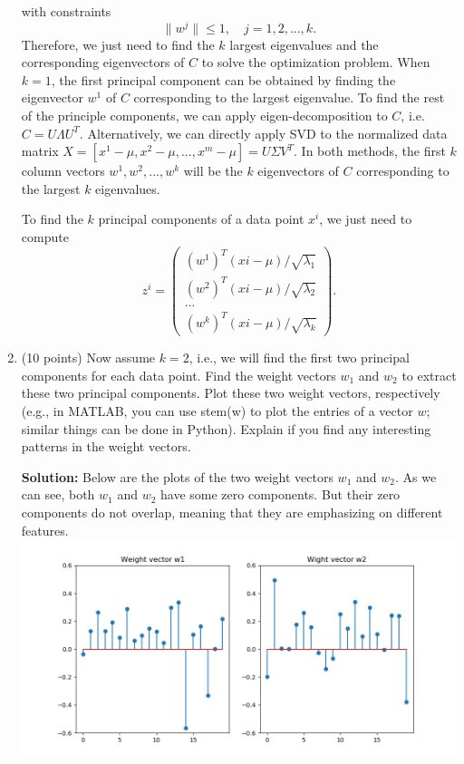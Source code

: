 \documentclass[twoside,12pt]{article}
\begin{document}
\begin{enumerate}
\begin{tcolorbox}
with constraints $$\|w^j\| \leq 1, \quad j = 1, 2, ..., k.$$ 
Therefore, we just need to find the $k$ largest eigenvalues and the corresponding eigenvectors of $C$ to solve the optimization problem. When $k = 1$, the first principal component can be obtained by finding the eigenvector $w^1$ of $C$ corresponding to the largest eigenvalue. To find the rest of the principle components, we can apply eigen-decomposition to $C$, i.e. $C = U\Lambda U^T$. Alternatively, we can directly apply SVD to the normalized data matrix $X = [x^1-\mu, x^2-\mu, ..., x^m - \mu] = U\Sigma V^T$. In both methods, the first $k$ column vectors $w^1, w^2, ..., w^k$ will be the $k$ eigenvectors of $C$ corresponding to the largest $k$ eigenvalues. 
\end{tcolorbox}

\begin{tcolorbox}
To find the $k$ principal components of a data point $x^i$, we just need to compute 
$$ z^i = \left( \begin{array}{c} (w^1)^T(xi-\mu)/\sqrt{\lambda_1} \\ (w^2)^T(xi-\mu)/\sqrt{\lambda_2} \\ ...\\ (w^k)^T(xi-\mu)/\sqrt{\lambda_k} \end{array} \right).$$
\end{tcolorbox}

\item (10 points) Now assume $k = 2$, i.e., we will find the first two principal components for each data point. Find the weight vectors $w_1$ and $w_2$ to extract these two principal components. Plot these two weight vectors, respectively (e.g., in MATLAB, you can use \textsf{stem(w)} to plot the entries of a vector $w$; similar things can be done in Python). Explain if you find any interesting patterns in the weight vectors. 
\begin{tcolorbox}
\textbf{Solution:} Below are the plots of the two weight vectors $w_1$ and $w_2$. As we can see, both $w_1$ and $w_2$ have some zero components. But their zero components do not overlap, meaning that they are emphasizing on different features. \\
 \includegraphics[width=.99\textwidth]{weights_vectors.png}
\end{tcolorbox}


\end{enumerate}
\end{document}
